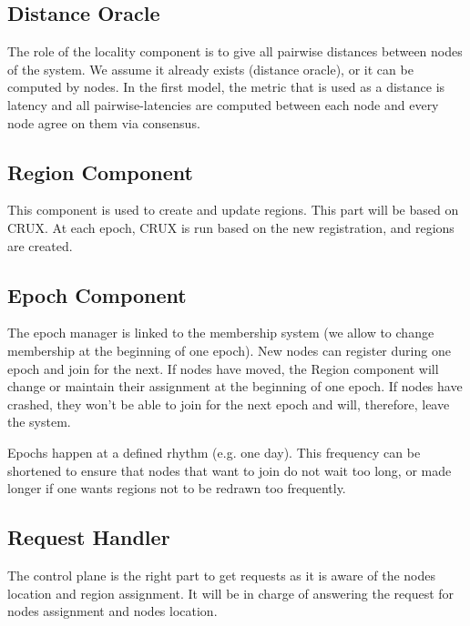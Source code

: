\documentclass[a4paper,11pt,oneside]{report}
\begin{document}
\subsection{Distance Oracle}

The role of the locality component is to give all pairwise distances between
nodes of the system. We assume it already exists (distance oracle), or it can
be computed by nodes. In the first model, the metric that is used as a distance
is latency and all pairwise-latencies are computed between each node and every
node agree on them via consensus. 
 
\subsection{Region Component} This component is used to create and update
regions. This part will be based on CRUX. At each epoch, CRUX is run based on
the new registration, and regions are created.
 
\subsection{Epoch Component} The epoch manager is linked to the membership
system (we allow to change membership at the beginning of one epoch). New nodes
can register during one epoch and join for the next. If nodes have moved, the Region
component will change or maintain their assignment at the beginning of one
epoch. If nodes have crashed, they won't be able to join for the next epoch and
will, therefore, leave the system.

Epochs happen at a defined rhythm (e.g. one day). This frequency can be
shortened to ensure that nodes that want to join do not wait too long, or made
longer if one wants regions not to be redrawn too frequently. 

\subsection{Request Handler} The control plane is the right part to get
requests as it is aware of the nodes location and region assignment. It will be
in charge of answering the request for nodes assignment and nodes location. 
\end{document}

